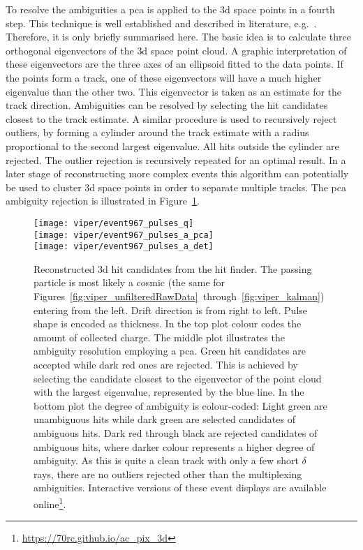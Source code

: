 To resolve the ambiguities a \gls{pca} is applied to the \gls{3d} space points in a fourth step.
This technique is well established and described in literature, e.g.~\cite{pca}.
Therefore, it is only briefly summarised here.
The basic idea is to calculate three orthogonal eigenvectors of the \gls{3d} space point cloud.
A graphic interpretation of these eigenvectors are the three axes of an ellipsoid fitted to the data points.
If the points form a track, one of these eigenvectors will have a much higher eigenvalue than the other two.
This eigenvector is taken as an estimate for the track direction.
Ambiguities can be resolved by selecting the hit candidates closest to the track estimate.
A similar procedure is used to recursively reject outliers, by forming a cylinder around the track estimate with a radius proportional to the second largest eigenvalue.
All hits outside the cylinder are rejected.
The outlier rejection is recursively repeated for an optimal result.
In a later stage of reconstructing more complex events this algorithm can potentially be used to cluster \gls{3d} space points in order to separate multiple tracks.
The \gls{pca} ambiguity rejection is illustrated in Figure~\ref{fig:viper_pca}.

\begin{figure}[htb]
	\begin{minipage}{\textwidth}
		\centering
		\texttt{[image: viper/event967\_pulses\_q]} \\
		\texttt{[image: viper/event967\_pulses\_a\_pca]} \\
		\texttt{[image: viper/event967\_pulses\_a\_det]}
		\caption[Reconstructed  hits of typical pixel demonstrator event]{%
			Reconstructed \acrshort{3d} hit candidates from the hit finder.
			The passing particle is most likely a cosmic \Pgm (the same for Figures~\ref{fig:viper_unfilteredRawData}~through~\ref{fig:viper_kalman}) entering from the left.
			Drift direction is from right to left.
			Pulse shape is encoded as thickness.
			In the top plot colour codes the amount of collected charge.
			The middle plot illustrates the ambiguity resolution employing a \acrshort{pca}.
			Green hit candidates are accepted while dark red ones are rejected.
			This is achieved by selecting the candidate closest to the eigenvector of the point cloud with the largest eigenvalue, represented by the blue line.
			In the bottom plot the degree of ambiguity is colour-coded: Light green are unambiguous hits while dark green are selected candidates of ambiguous hits.
			Dark red through black are rejected candidates of ambiguous hits, where darker colour represents a higher degree of ambiguity.
			As this is quite a clean track with only a few short $\delta$ rays, there are no outliers rejected other than the multiplexing ambiguities.
			Interactive versions of these event displays are available online\footnote{\url{https://70rc.github.io/ac_pix_3d}}.
		}
		\label{fig:viper_pca}
	\end{minipage}
\end{figure}

